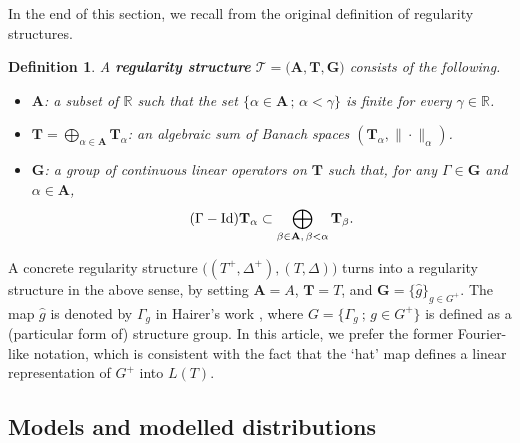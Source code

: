\documentclass[10pt, reqno]{amsart}
\numberwithin{subsection}{section}
\numberwithin{subsubsection}{subsection}
\numberwithin{equation}{section} %
\theoremstyle{mystyle}
\theoremstyle{mystyle2}
\newtheorem*{defn*} {Definition}
\theoremstyle{mystyle3}
\newcommand{\iden}{\text{\rm Id}}
\newcommand\bbR{\mathbb{R}}
\newcommand{\bfA}{\mathbf{A}}
\newcommand{\bfG}{\mathbf{G}}
\newcommand{\bfT}{\mathbf{T}}
\begin{document}
\medskip

In the end of this section, we recall from \cite{Hai14} the original definition of regularity structures.

\medskip

\begin{defn*}
A \textbf{\textsf{regularity structure}} $\mathscr{T} = \big( \bfA,\bfT,\bfG \big)$ consists of the following.
\begin{itemize} \setlength{\itemsep}{0.1cm}
\item[(1)]
$\bfA$: a subset of $\bbR$ such that the set $\{\alpha\in \bfA\, ;\, \alpha<\gamma\}$ is finite for every $\gamma\in\bbR$.
\item[(2)]
$\bfT=\bigoplus_{\alpha\in \bfA}\bfT_\alpha$: an algebraic sum of Banach spaces $(\bfT_\alpha,\|\cdot\|_\alpha)$.
\item[(3)]
$\bfG$: a group of continuous linear operators on $\bfT$ such that, for any $\Gamma\in \bfG$ and $\alpha\in\bfA$,
$$
(\Gamma-\iden)\bfT_\alpha\subset \bigoplus_{\beta\in \bfA,\, \beta<\alpha}\bfT_\beta.
$$
\end{itemize}
\end{defn*}

\medskip

A concrete regularity structure $\big((T^+,\Delta^+), (T,\Delta)\big)$ turns into a regularity structure in the above sense, by setting $\bfA=A$, $\bfT=T$, and $\bfG=\{\widehat{g}\}_{g\in G^+}$.
The map $\widehat{g}$ is denoted by $\Gamma_g$ in Hairer's work \cite{Hai14}, where $G=\{\Gamma_g\ ;\, g\in G^+\}$ is defined as a (particular form of) structure group. In this article, we prefer the former Fourier-like notation, which is consistent with the fact that the `hat' map defines a linear representation of $G^+$ into $L(T)$.



\bigskip



\subsection{Models and modelled distributions}
\label{SubsectionModelsAndCo}
\end{document}
